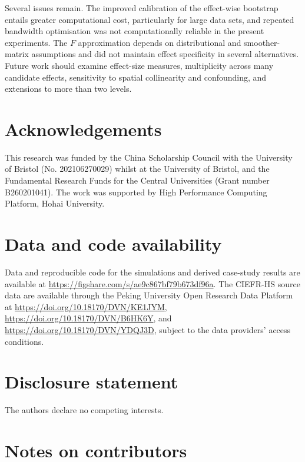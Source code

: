 \documentclass[times]{interact}
\theoremstyle{plain}%
\theoremstyle{definition}
\theoremstyle{remark}
\begin{document}
Several issues remain.
The improved calibration of the effect-wise bootstrap entails greater computational cost, particularly for large data sets, and repeated bandwidth optimisation was not computationally reliable in the present experiments.
The $F$ approximation depends on distributional and smoother-matrix assumptions and did not maintain effect specificity in several alternatives.
Future work should examine effect-size measures, multiplicity across many candidate effects, sensitivity to spatial collinearity and confounding, and extensions to more than two levels.

\section*{Acknowledgements}

This research was funded by the China Scholarship Council with the University of Bristol (No. 202106270029) whilst at the University of Bristol, and the Fundamental Research Funds for the Central Universities (Grant number B260201041).
The work was supported by High Performance Computing Platform, Hohai University.

\section*{Data and code availability}

Data and reproducible code for the simulations and derived case-study results are available at \url{https://figshare.com/s/ae9c867bf79b673df96a}.
The CIEFR-HS source data are available through the Peking University Open Research Data Platform at \url{https://doi.org/10.18170/DVN/KE1JYM}, \url{https://doi.org/10.18170/DVN/B6HK6Y}, and \url{https://doi.org/10.18170/DVN/YDQJ3D}, subject to the data providers' access conditions.

\section*{Disclosure statement}

The authors declare no competing interests.

\section*{Notes on contributors}
\end{document}
